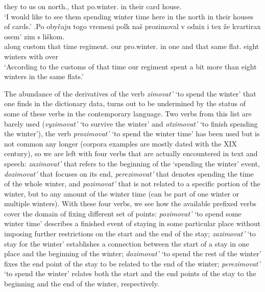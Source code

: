 they {} to us on north., that po.winter. in their card house.\\
\trans `I would like to see them spending winter time here in the north in their houses of cards.'
\bg.\label{ex:prozimovat'}Po oby\v{c}aju togo vremeni polk na\v{s} prozimoval v odnix i tex \v{z}e kvartirax osem' zim s li\v{s}kom.\\
along custom that time regiment. our pro.winter. in one and that same flat. eight winters with over\\
\trans `According to the customs of that time our regiment spent a bit more than eight winters in the same flats.'\\

The abundance of the derivatives of the verb \textit{zimovat'} `to spend the winter' that one finds in the dictionary data, turns out to be undermined by the status of some of these verbs in the contemporary language. Two verbs from this list are barely used (\textit{vyzimovat'} `to survive the winter' and \textit{otzimovat'} `to finish spending the winter'), the verb \textit{prozimovat'} `to spend the winter time' has been used but is not common any longer (corpora examples are mostly dated with the XIX century), so we are left with four verbs that are actually encountered in text and speech: \textit{zazimovat'} that refers to the beginning of the `spending the winter' event, \textit{dozimovat'} that focuses on its end, \textit{perezimovat'} that denotes spending the time of the whole winter, and \textit{pozimovat'} that is not related to a specific portion of the winter, but to any amount of the winter time (can be part of one winter or multiple winters). With these four verbs, we see how the available prefixed verbs cover the domain of fixing different set of points: \textit{pozimovat'} `to spend some winter time' describes a finished event of staying in some particular place without imposing further restrictions on the start and the end of the stay; \textit{zazimovat'} `to stay for the winter' establishes a connection between the start of a stay in one place and the beginning of the winter; \textit{dozimovat'} `to spend the rest of the winter' fixes the end point of the stay to be related to the end of the winter; \textit{perezimovat'} `to spend the winter' relates both the start and the end points of the stay to the beginning and the end of the winter, respectively.

